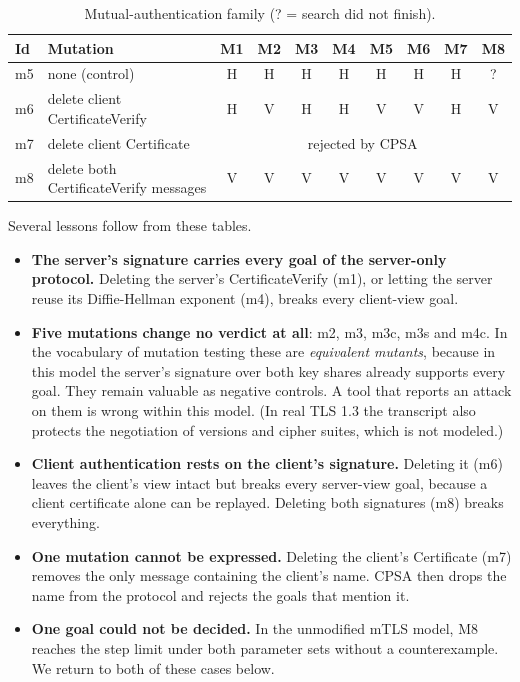 \documentclass[11pt]{article}
\begin{document}
\begin{table}[h!]
\centering
\small
\begin{tabular}{|l|p{6.2cm}|c|c|c|c|c|c|c|c|}
\hline
\textbf{Id} & \textbf{Mutation} & M1 & M2 & M3 & M4 & M5 & M6 & M7 & M8 \\
\hline
m5 & none (control) & H & H & H & H & H & H & H & ? \\
m6 & delete client CertificateVerify & H & V & H & H & V & V & H & V \\
m7 & delete client Certificate & \multicolumn{8}{c|}{rejected by CPSA} \\
m8 & delete both CertificateVerify messages & V & V & V & V & V & V & V & V \\
\hline
\end{tabular}
\caption{Mutual-authentication family (? = search did not finish).}
\label{tab:resultsM}
\end{table}

Several lessons follow from these tables.
\begin{itemize}
    \item \textbf{The server's signature carries every goal of the server-only protocol.} Deleting the server's CertificateVerify (m1), or letting the server reuse its Diffie-Hellman exponent (m4), breaks every client-view goal.
    \item \textbf{Five mutations change no verdict at all}: m2, m3, m3c, m3s and m4c. In the vocabulary of mutation testing these are \textit{equivalent mutants}, because in this model the server's signature over both key shares already supports every goal. They remain valuable as negative controls. A tool that reports an attack on them is wrong within this model. (In real TLS 1.3 the transcript also protects the negotiation of versions and cipher suites, which is not modeled.)
    \item \textbf{Client authentication rests on the client's signature.} Deleting it (m6) leaves the client's view intact but breaks every server-view goal, because a client certificate alone can be replayed. Deleting both signatures (m8) breaks everything.
    \item \textbf{One mutation cannot be expressed.} Deleting the client's Certificate (m7) removes the only message containing the client's name. CPSA then drops the name from the protocol and rejects the goals that mention it.
    \item \textbf{One goal could not be decided.} In the unmodified mTLS model, M8 reaches the step limit under both parameter sets without a counterexample. We return to both of these cases below.
\end{itemize}
\end{document}
